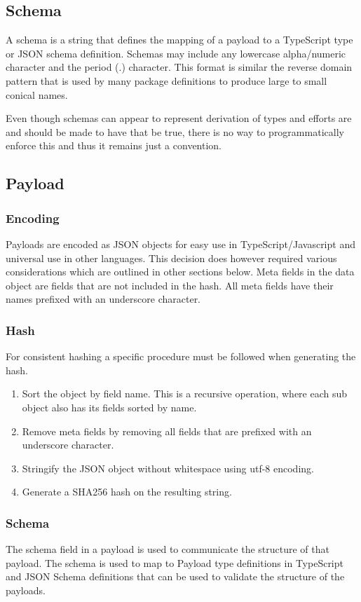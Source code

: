 \documentclass{article}
\begin{document}
\subsection{Schema}
A schema is a string that defines the mapping of a payload to a TypeScript type or JSON schema definition.  Schemas may include any lowercase alpha/numeric character and the period (.) character.  This format is similar the reverse domain pattern that is used by many package definitions to produce large to small conical names.

Even though schemas can appear to represent derivation of types and efforts are and should be made to have that be true, there is no way to programmatically enforce this and thus it remains just a convention.

\subsection{Payload}
\subsubsection{Encoding}
Payloads are encoded as JSON objects for easy use in TypeScript/Javascript and universal use in other languages.  This decision does however required various considerations which are outlined in other sections below. Meta fields in the data object are fields that are not included in the hash.  All meta fields have their names prefixed with an underscore character.

\subsubsection{Hash}
For consistent hashing a specific procedure must be followed when generating the hash.

\begin{enumerate}
\item Sort the object by field name.  This is a recursive operation, where each sub object also has its fields sorted by name.
\item Remove meta fields by removing all fields that are prefixed with an underscore character.
\item Stringify the JSON object without whitespace using utf-8 encoding.
\item Generate a SHA256 hash on the resulting string.
\end{enumerate}

\subsubsection{Schema}
The schema field in a payload is used to communicate the structure of that payload.  The schema is used to map to Payload type definitions in TypeScript and JSON Schema definitions that can be used to validate the structure of the payloads.
\end{document}
